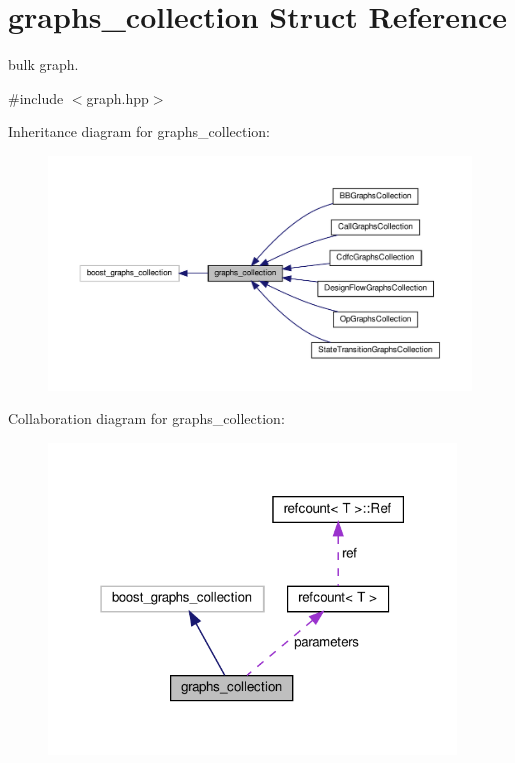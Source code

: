 \hypertarget{structgraphs__collection}{}\section{graphs\+\_\+collection Struct Reference}
\label{structgraphs__collection}


bulk graph.  




{\ttfamily \#include $<$graph.\+hpp$>$}



Inheritance diagram for graphs\+\_\+collection\+:
\nopagebreak
\begin{figure}[H]
\begin{center}
\leavevmode
\includegraphics[width=350pt]{d7/dca/structgraphs__collection__inherit__graph}
\end{center}
\end{figure}


Collaboration diagram for graphs\+\_\+collection\+:
\nopagebreak
\begin{figure}[H]
\begin{center}
\leavevmode
\includegraphics[width=307pt]{da/dfc/structgraphs__collection__coll__graph}
\end{center}
\end{figure}
